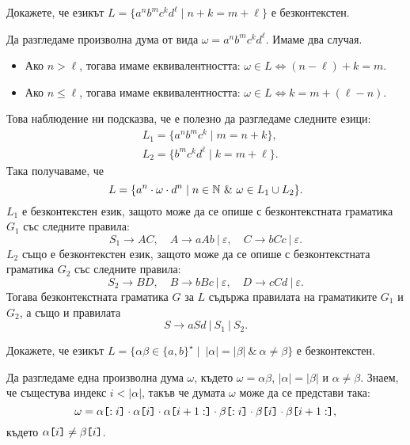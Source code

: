 \begin{extra}
\begin{problem}
  Докажете, че езикът $L = \{a^nb^mc^kd^\ell \mid n+k = m + \ell\}$ е безконтекстен.
\end{problem}
\begin{hint}
  Да разгледаме произволна дума от вида $\omega = a^n b^m c^k d^\ell$.
  Имаме два случая.
  \begin{itemize}
  \item
    Ако $n > \ell$, тогава имаме еквивалентността: $\omega \in L \iff (n-\ell) + k = m$.
  \item
    Ако $n \leq \ell$, тогава имаме еквивалентността: $\omega \in L \iff k = m + (\ell- n)$.
  \end{itemize}
  Това наблюдение ни подсказва, че е полезно да разгледаме следните езици:
  \begin{align*}
    & L_1 = \{a^nb^mc^k \mid m = n+k\},\\
    & L_2 = \{b^mc^kd^\ell \mid k = m+\ell\}.
  \end{align*}
  Така получаваме, че
  \[L = \{a^n \cdot \omega \cdot d^n \mid n\in\Nat\ \&\ \omega \in L_1 \cup L_2\}.\]
  $L_1$ е безконтекстен език, защото може да се опише с безконтекстната граматика $G_1$ със следните правила:
  \[S_1 \to AC,\quad  A \to aAb\ |\ \varepsilon,\quad C \to bCc\ |\ \varepsilon.\]
  $L_2$ също е безконтекстен език, защото може да се опише с безконтекстната граматика $G_2$ със следните правила:
  \[S_2 \to BD,\quad B \to bBc\ |\ \varepsilon,\quad D \to cCd\ |\ \varepsilon.\]
  Тогава безконтекстната граматика $G$ за $L$ 
  съдържа правилата на граматиките $G_1$ и $G_2$, а също и правилата
  \[S \to aSd\ |\ S_1\ |\ S_2.\]
\end{hint}

\begin{problem}
  \label{prob:equal-but-different}
  Докажете, че езикът $L = \{\alpha\beta \in \{a,b\}^\star \mid\ |\alpha| = |\beta|\ \&\ \alpha \neq \beta\}$ е безконтекстен.
\end{problem}
\begin{hint}
  Да разгледаме една произволна дума $\omega$, където $\omega = \alpha\beta$, $|\alpha| = |\beta|$ и $\alpha \neq \beta$.
  Знаем, че същестува индекс $i < |\alpha|$, такъв че думата $\omega$ може да се представи така:
  \[\omega = \alpha\texttt{[}{:i}\texttt{]} \cdot \alpha\texttt{[}{i}\texttt{]} \cdot \alpha\texttt{[}{i+1:}\texttt{]} \cdot \beta\texttt{[}{:i}\texttt{]} \cdot \beta\texttt{[}{i}\texttt{]} \cdot \beta\texttt{[}{i+1:}\texttt{]},\]
  където $\alpha\texttt{[}{i}\texttt{]} \neq \beta\texttt{[}{i}\texttt{]}$.


\end{hint}
\end{extra}
